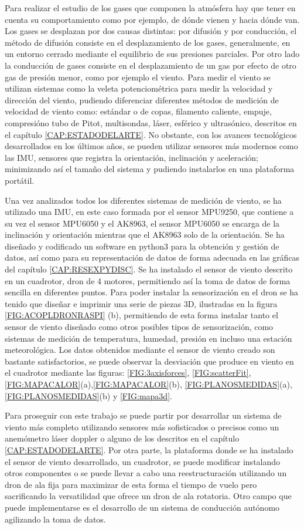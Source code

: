 
Para realizar el estudio de los gases que componen la atmósfera hay que tener en cuenta su comportamiento como por ejemplo, de dónde vienen y hacia dónde van. Los gases se desplazan por dos causas distintas: por difusión y por conducción, el método de difusión consiste en el desplazamiento de los gases, generalmente, en un entorno cerrado mediante el equilibrio de sus presiones parciales. Por otro lado la conducción de gases consiste en el desplazamiento de un gas por efecto de otro gas de presión menor, como por ejemplo el viento. Para medir el viento se utilizan sistemas como la veleta potenciométrica\cite{Mur2012} para medir la velocidad y dirección del viento, pudiendo diferenciar diferentes métodos de medición de velocidad de viento como: estándar o de copas, filamento caliente, empuje, compresióno tubo de Pitot, multisondas, láser, esférico y ultrasónico, descritos en el capítulo \ref{CAP:ESTADODELARTE}. No obstante, con los avances tecnológicos desarrollados en los últimos años, se pueden utilizar sensores más modernos  como las IMU, sensores que registra la orientación, inclinación y aceleración; minimizando así el tamaño del sistema y pudiendo instalarlos en una plataforma portátil.

Una vez analizados todos los diferentes sistemas de medición de viento, se ha utilizado una IMU, en este caso formada por el sensor MPU9250, que contiene a su vez el sensor MPU6050 y el AK8963, el sensor MPU6050 se encarga de la inclinación y orientación mientras que el AK8963 solo de la orientación. Se ha diseñado y codificado un software en python3 para la obtención y gestión de datos, así como para su representación de datos de forma adecuada en las gráficas del capítulo \ref{CAP:RESEXPYDISC}. Se ha instalado el sensor de viento descrito en un cuadrotor, dron de 4 motores, permitiendo así la toma de datos de forma sencilla en diferentes puntos. Para poder instalar la sensorización en el dron se ha tenido que diseñar e imprimir una serie de piezas 3D, ilustradas en la figura \ref{FIG:ACOPLDRONRASPI} (b), permitiendo de esta forma instalar tanto el sensor de viento diseñado como otros posibles tipos de sensorización, como sistemas de medición de temperatura, humedad, presión en incluso una estación meteorológica. Los datos obtenidos mediante el sensor de viento creado son bastante satisfactorios, se puede observar la desviación que produce en viento en el cuadrotor mediante las figuras: \ref{FIG:3axisforces}, \ref{FIG:scatterFit}, \ref{FIG:MAPACALOR}(a),\ref{FIG:MAPACALOR}(b), \ref{FIG:PLANOSMEDIDAS}(a), \ref{FIG:PLANOSMEDIDAS}(b) y \ref{FIG:mapa3d}.

Para proseguir con este trabajo se puede partir por desarrollar un sistema de viento más completo utilizando sensores más sofisticados o precisos como un anemómetro láser doppler o alguno de los descritos en el capítulo \ref{CAP:ESTADODELARTE}. Por otra parte, la plataforma donde se ha instalado el sensor de viento desarrollado, un cuadrotor, se puede modificar instalando otros componentes o se puede llevar a cabo una reestructuración utilizando un dron de ala fija para maximizar de esta forma el tiempo de vuelo pero sacrificando la versatilidad que ofrece un dron de ala rotatoria. Otro campo que puede implementarse es el desarrollo de un sistema de conducción autónomo agilizando la toma de datos.